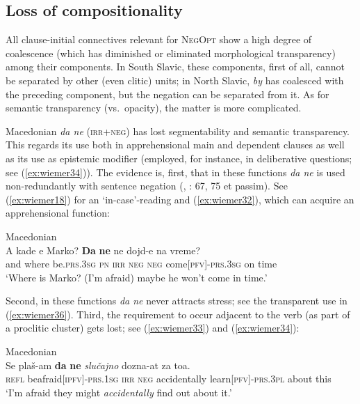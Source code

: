 \documentclass[output=paper,colorlinks,citecolor=brown]{langscibook}
\begin{document}
\subsection{Loss of compositionality}
\label{subsec:lossofcomp}

All clause-initial connectives relevant for \textsc{NegOpt} show a high degree of coalescence (which has diminished or eliminated morphological transparency) among their components. In South Slavic, these components, first of all, cannot be separated by other (even clitic) units; in North Slavic, \textit{by} has coalesced with the preceding component, but the negation can be separated from it. As for semantic transparency (vs.\ opacity), the matter is more complicated.


Macedonian \textit{da ne} (\textsc{irr+neg}) has lost segmentability and semantic transparency. This regards its use both in apprehensional main and dependent clauses as well as its use as epistemic modifier (employed, for instance, in deliberative questions; see (\ref{ex:wiemer34})). The evidence is, first, that in these functions \textit{da ne} is used non-redundantly with sentence negation (\citealt{Bužarovska2017}, \citealt{MitkovskaEtAl2017}: 67, 75 et passim). See (\ref{ex:wiemer18}) for an `in-case'-reading and (\ref{ex:wiemer32}), which can acquire an apprehensional function:


\ea \textnormal{Macedonian} \\
\label{ex:wiemer32} 
\gll A kade e Marko? \textbf{Da} \textbf{ne} ne dojd-e na vreme? \\
and	where be.\textsc{prs.3sg} \textsc{pn} \textsc{irr} \textsc{neg} \textsc{neg} come\textsc{[pfv]-prs.3sg} on time \\
\glt `Where is Marko? (I'm afraid) maybe he won't come in time.'
\z


 Second, in these functions \textit{da ne} never attracts stress; see the transparent use in (\ref{ex:wiemer36}). Third, the requirement to occur adjacent to the verb (as part of a proclitic cluster) gets lost; see (\ref{ex:wiemer33}) and (\ref{ex:wiemer34}):


\ea 
\label{ex:wiemer33} \textnormal{Macedonian} \\
\gll Se plaš-am \textbf{da} \textbf{ne} \textit{slučajno} dozna-at za toa. \\
\textsc{refl} be\textunderscore afraid\textsc{[ipfv]-prs.1sg} \textsc{irr} \textsc{neg} accidentally learn\textsc{[pfv]-prs.3pl} about this \\
\glt `I'm afraid they might \textit{accidentally} find out about it.'
\z
\end{document}
